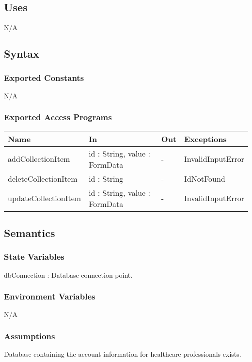 \documentclass[12pt, titlepage]{article}
\begin{document}
\subsection{Uses}
N/A

\subsection{Syntax}

\subsubsection{Exported Constants}
N/A

\subsubsection{Exported Access Programs}

\begin{center}
\begin{tabular}{p{3.5cm} p{4cm} p{1cm} p{2.5cm}}
\hline
\textbf{Name} & \textbf{In} & \textbf{Out} & \textbf{Exceptions} \\
\hline
addCollectionItem & id : String, value : FormData & - & InvalidInputError \\
deleteCollectionItem & id : String & - & IdNotFound\\
updateCollectionItem & id : String, value : FormData & - & InvalidInputError \\
\hline
\end{tabular}
\end{center}

\subsection{Semantics}

\subsubsection{State Variables}
dbConnection : Database connection point.

\subsubsection{Environment Variables}
N/A

\subsubsection{Assumptions}
Database containing the account information for healthcare professionals exists.
\end{document}
